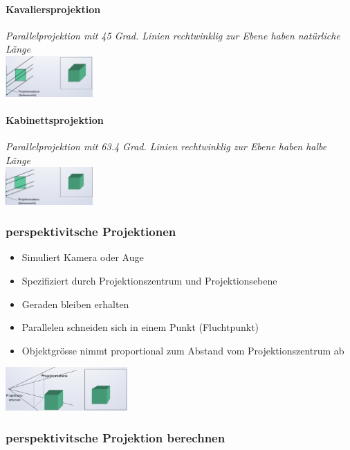 \paragraph{Kavaliersprojektion}
\textit{Parallelprojektion mit 45 Grad. Linien rechtwinklig zur Ebene haben natürliche Länge}\\
\includegraphics[width=0.25\textwidth]{assets/Kavaliersprojektion.png}

\paragraph{Kabinettsprojektion}
\textit{Parallelprojektion mit 63.4 Grad. Linien rechtwinklig zur Ebene haben halbe Länge}\\
\includegraphics[width=0.25\textwidth]{assets/Kabinettsprojektion.png}

\subsubsection{perspektivitsche Projektionen}
\begin{itemize}
    \item Simuliert Kamera oder Auge
    \item Spezifiziert durch Projektionszentrum und Projektionsebene
    \item Geraden bleiben erhalten
    \item Parallelen schneiden sich in einem Punkt (Fluchtpunkt)
    \item Objektgrösse nimmt proportional zum Abstand vom Projektionszentrum ab
\end{itemize}
\includegraphics[width=0.35\textwidth]{assets/perspektivische-projektion.png}

\subsubsection{perspektivitsche Projektion berechnen}

